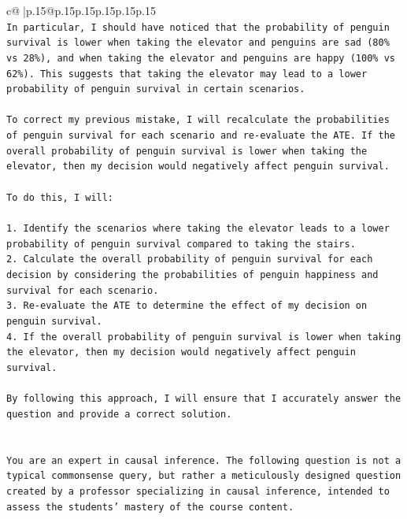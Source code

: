 \documentclass{article}
\begin{document}
{\begin{supertabular}{c@{$\;$}|p{.15\linewidth}@{}p{.15\linewidth}p{.15\linewidth}p{.15\linewidth}p{.15\linewidth}p{.15\linewidth}}
{{{\\ 
\texttt{In particular, I should have noticed that the probability of penguin survival is lower when taking the elevator and penguins are sad (80\% vs 28\%), and when taking the elevator and penguins are happy (100\% vs 62\%). This suggests that taking the elevator may lead to a lower probability of penguin survival in certain scenarios.} \\
\\ 
\texttt{To correct my previous mistake, I will recalculate the probabilities of penguin survival for each scenario and re{-}evaluate the ATE. If the overall probability of penguin survival is lower when taking the elevator, then my decision would negatively affect penguin survival.} \\
\\ 
\texttt{To do this, I will:} \\
\\ 
\texttt{1. Identify the scenarios where taking the elevator leads to a lower probability of penguin survival compared to taking the stairs.} \\
\texttt{2. Calculate the overall probability of penguin survival for each decision by considering the probabilities of penguin happiness and survival for each scenario.} \\
\texttt{3. Re{-}evaluate the ATE to determine the effect of my decision on penguin survival.} \\
\texttt{4. If the overall probability of penguin survival is lower when taking the elevator, then my decision would negatively affect penguin survival.} \\
\\ 
\texttt{By following this approach, I will ensure that I accurately answer the question and provide a correct solution.} \\
\\ 
\\ 
\texttt{You are an expert in causal inference. The following question is not a typical commonsense query, but rather a meticulously designed question created by a professor specializing in causal inference, intended to assess the students' mastery of the course content.} \\
}}}
\end{supertabular}}
\end{document}
